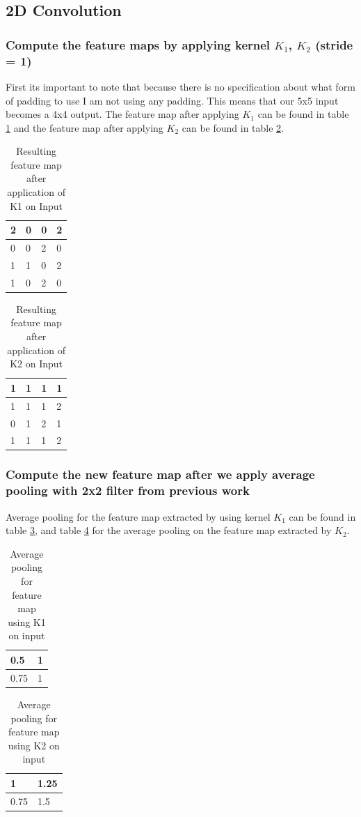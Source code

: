 \documentclass[11pt]{article}
\begin{document}
\subsection{2D Convolution}
\subsubsection{Compute the feature maps by applying kernel $K_1$, $K_2$ (stride = 1)}
First its important to note that because there is no specification about what form of padding to use I am not using any padding. This means that our 5x5 input becomes a 4x4 output. The feature map after applying $K_1$ can be found in table \ref{tab:conv1-k1} and the feature map after applying $K_2$ can be found in table \ref{tab:conv1-k2}. 
\begin{table}[]
\begin{tabular}{|l|l|l|l|} \hline
2 & 0 & 0 & 2 \\ \hline
0 & 0 & 2 & 0 \\ \hline
1 & 1 & 0 & 2 \\ \hline
1 & 0 & 2 & 0 \\ \hline
\end{tabular}
\caption{Resulting feature map after application of K1 on Input}
\label{tab:conv1-k1}
\end{table}
\begin{table}[]
\begin{tabular}{|l|l|l|l|} \hline
1 & 1 & 1 & 1 \\ \hline
1 & 1 & 1 & 2 \\ \hline
0 & 1 & 2 & 1 \\ \hline
1 & 1 & 1 & 2 \\ \hline
\end{tabular}
\caption{Resulting feature map after application of K2 on Input}
\label{tab:conv1-k2}
\end{table}
\subsubsection{Compute the new feature map after we apply average pooling with 2x2 filter from previous work}
Average pooling for the feature map extracted by using kernel $K_1$ can be found in table \ref{tab:conv-k1-average}, and table \ref{tab:conv1-k2-average} for the average pooling on the feature map extracted by $K_2$.
\begin{table}[]
\begin{tabular}{|l|l|} \hline
0.5 & 1 \\ \hline
0.75 & 1 \\ \hline
\end{tabular}
\caption{Average pooling for feature map using K1 on input}
\label{tab:conv-k1-average}
\end{table}
\begin{table}[]
\begin{tabular}{|l|l|} \hline
1 & 1.25 \\ \hline
0.75 & 1.5 \\ \hline
\end{tabular}
\caption{Average pooling for feature map using K2 on input}
\label{tab:conv1-k2-average}
\end{table}
\end{document}
